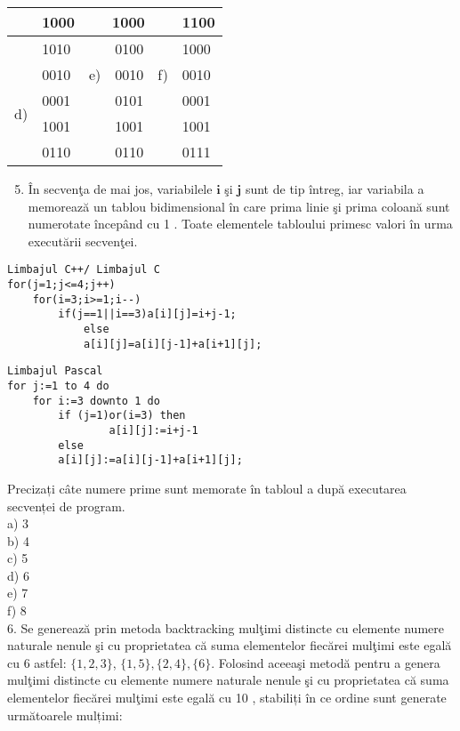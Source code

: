 \begin{center}
\begin{tabular}{|l|l|l|l|l|l|}
\hline
\multirow{2}{*}{} & 1000 & \multicolumn{3}{|c|}{1000} & 1100 \\
\hline
 & 1010 &  & 0100 &  & 1000 \\
\hline
\multirow[t]{4}{*}{d)} & 0010 & e) & 0010 & f) & 0010 \\
\hline
 & 0001 &  & 0101 &  & 0001 \\
\hline
 & 1001 &  & 1001 &  & 1001 \\
\hline
 & 0110 &  & 0110 &  & 0111 \\
\hline
\end{tabular}
\end{center}

\begin{enumerate}
  \setcounter{enumi}{4}
  \item În secvenţa de mai jos, variabilele $\mathbf{i}$ şi $\mathbf{j}$ sunt de tip întreg, iar variabila a memorează un tablou bidimensional în care prima linie şi prima coloană sunt numerotate începând cu 1 . Toate elementele tabloului primesc valori în urma executării secvenţei.
\end{enumerate}

\begin{verbatim}
Limbajul C++/ Limbajul C
for(j=1;j<=4;j++)
    for(i=3;i>=1;i--)
        if(j==1||i==3)a[i][j]=i+j-1;
            else
            a[i][j]=a[i][j-1]+a[i+1][j];
\end{verbatim}

\begin{verbatim}
Limbajul Pascal
for j:=1 to 4 do
    for i:=3 downto 1 do
        if (j=1)or(i=3) then
                a[i][j]:=i+j-1
        else
        a[i][j]:=a[i][j-1]+a[i+1][j];
\end{verbatim}

Precizați câte numere prime sunt memorate în tabloul a după executarea secvenței de program.\\
a) 3\\
b) 4\\
c) 5\\
d) 6\\
e) 7\\
f) 8\\
6. Se generează prin metoda backtracking mulţimi distincte cu elemente numere naturale nenule şi cu proprietatea că suma elementelor fiecărei mulţimi este egală cu 6 astfel: $\{1,2,3\}$, $\{1,5\},\{2,4\},\{6\}$. Folosind aceeaşi metodă pentru a genera mulţimi distincte cu elemente numere naturale nenule şi cu proprietatea că suma elementelor fiecărei mulţimi este egală cu 10 , stabiliți în ce ordine sunt generate următoarele mulțimi:

